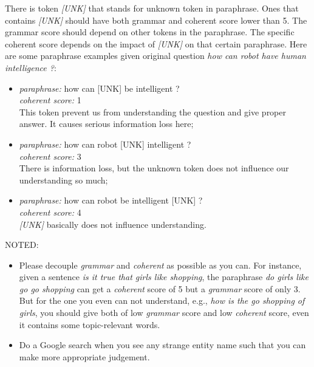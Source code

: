 \documentclass[11pt,a4paper]{article}
\begin{document}
There is token \textit{[UNK]} that stands for unknown token in paraphrase. Ones that contains \textit{[UNK]} should have both grammar and coherent score lower than 5. The grammar score should depend on other tokens in the paraphrase. The specific coherent score depends on the impact of \textit{[UNK]} on that certain paraphrase. Here are some paraphrase examples given original question \textit{how can robot have human intelligence ?}:
    \begin{itemize}
        \item \textit{paraphrase:} how can [UNK] be intelligent ? \\
            \textit{coherent score:} 1\\
             This token prevent us from understanding the
            question and give proper answer. It causes serious information loss here;
        \item \textit{paraphrase:} how can robot [UNK] intelligent ?\\
                \textit{coherent score:} 3\\
             There is information loss, but the unknown token does not influence our understanding so much;
        \item \textit{paraphrase:} how can robot be intelligent [UNK] ?\\
                \textit{coherent score:} 4\\
             \textit{[UNK]} basically does not influence understanding.
    \end{itemize}

NOTED:
    \begin{itemize}
      \item Please decouple \textit{grammar} and \textit{coherent} as possible as you can. For instance, given a sentence \textit{is it true that girls like shopping}, the paraphrase \textit{do girls like go go shopping} can get a \textit{coherent} score of 5 but a \textit{grammar} score of only 3. But for the one you even can not understand, e.g., \textit{how is the go shopping of girls}, you should give both of low \textit{grammar} score and low \textit{coherent} score, even it contains some topic-relevant words.
      \item Do a Google search when you see any strange entity name such that you can make more appropriate judgement.
    \end{itemize}
\end{document}
